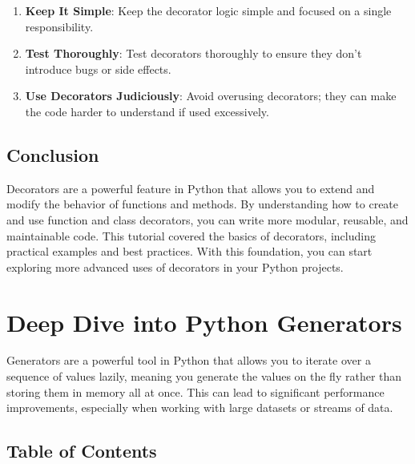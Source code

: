 \documentclass[
  letterpaper,
  DIV=11,
  numbers=noendperiod]{scrreprt}
\providecommand{\tightlist}{%
  \setlength{\itemsep}{0pt}\setlength{\parskip}{0pt}}\usepackage{longtable,booktabs,array}
\begin{document}
\begin{enumerate}
\def\labelenumi{\arabic{enumi}.}
\setcounter{enumi}{1}
\tightlist
\item
  \textbf{Keep It Simple}: Keep the decorator logic simple and focused
  on a single responsibility.
\item
  \textbf{Test Thoroughly}: Test decorators thoroughly to ensure they
  don't introduce bugs or side effects.
\item
  \textbf{Use Decorators Judiciously}: Avoid overusing decorators; they
  can make the code harder to understand if used excessively.
\end{enumerate}

\section{Conclusion}\label{conclusion-35}

Decorators are a powerful feature in Python that allows you to extend
and modify the behavior of functions and methods. By understanding how
to create and use function and class decorators, you can write more
modular, reusable, and maintainable code. This tutorial covered the
basics of decorators, including practical examples and best practices.
With this foundation, you can start exploring more advanced uses of
decorators in your Python projects.


\chapter{Deep Dive into Python
Generators}\label{deep-dive-into-python-generators}

Generators are a powerful tool in Python that allows you to iterate over
a sequence of values lazily, meaning you generate the values on the fly
rather than storing them in memory all at once. This can lead to
significant performance improvements, especially when working with large
datasets or streams of data.

\section{Table of Contents}\label{table-of-contents-12}
\end{document}
